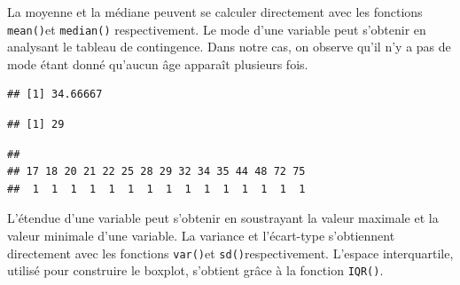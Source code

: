 \documentclass[
]{book}
\newenvironment{Shaded}{\begin{snugshade}}{\end{snugshade}}
\newcommand{\FunctionTok}[1]{\textcolor[rgb]{0.13,0.29,0.53}{\textbf{#1}}}
\newcommand{\NormalTok}[1]{#1}
\newcommand{\SpecialCharTok}[1]{\textcolor[rgb]{0.81,0.36,0.00}{\textbf{#1}}}
\begin{document}
La moyenne et la médiane peuvent se calculer directement avec les fonctions \texttt{mean()}et \texttt{median()} respectivement. Le mode d'une variable peut s'obtenir en analysant le tableau de contingence. Dans notre cas, on observe qu'il n'y a pas de mode étant donné qu'aucun âge apparaît plusieurs fois.

\begin{Shaded}
\end{Shaded}

\begin{verbatim}
## [1] 34.66667
\end{verbatim}

\begin{Shaded}
\end{Shaded}

\begin{verbatim}
## [1] 29
\end{verbatim}

\begin{Shaded}
\end{Shaded}

\begin{verbatim}
## 
## 17 18 20 21 22 25 28 29 32 34 35 44 48 72 75 
##  1  1  1  1  1  1  1  1  1  1  1  1  1  1  1
\end{verbatim}

L'étendue d'une variable peut s'obtenir en soustrayant la valeur maximale et la valeur minimale d'une variable. La variance et l'écart-type s'obtiennent directement avec les fonctions \texttt{var()}et \texttt{sd()}respectivement. L'espace interquartile, utilisé pour construire le boxplot, s'obtient grâce à la fonction \texttt{IQR()}.

\begin{Shaded}
\end{Shaded}
\end{document}

